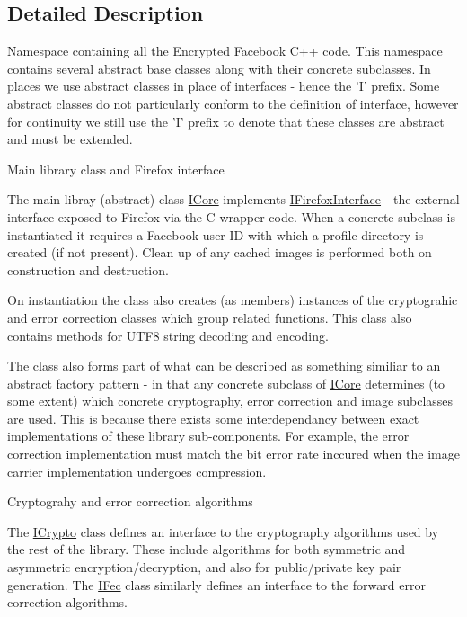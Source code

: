 \subsection{Detailed Description}
Namespace containing all the Encrypted Facebook C++ code. This namespace contains several abstract base classes along with their concrete subclasses. In places we use abstract classes in place of interfaces -\/ hence the 'I' prefix. Some abstract classes do not particularly conform to the definition of interface, however for continuity we still use the 'I' prefix to denote that these classes are abstract and must be extended.

\begin{DoxyParagraph}{Main library class and Firefox interface}

\end{DoxyParagraph}
The main libray (abstract) class \hyperlink{classefb_1_1ICore}{ICore} implements \hyperlink{classefb_1_1IFirefoxInterface}{IFirefoxInterface} -\/ the external interface exposed to Firefox via the C wrapper code. When a concrete subclass is instantiated it requires a Facebook user ID with which a profile directory is created (if not present). Clean up of any cached images is performed both on construction and destruction.

On instantiation the class also creates (as members) instances of the cryptograhic and error correction classes which group related functions. This class also contains methods for UTF8 string decoding and encoding.

The class also forms part of what can be described as something similiar to an abstract factory pattern -\/ in that any concrete subclass of \hyperlink{classefb_1_1ICore}{ICore} determines (to some extent) which concrete cryptography, error correction and image subclasses are used. This is because there exists some interdependancy between exact implementations of these library sub-\/components. For example, the error correction implementation must match the bit error rate inccured when the image carrier implementation undergoes compression.

\begin{DoxyParagraph}{Cryptograhy and error correction algorithms}

\end{DoxyParagraph}
The \hyperlink{classefb_1_1ICrypto}{ICrypto} class defines an interface to the cryptography algorithms used by the rest of the library. These include algorithms for both symmetric and asymmetric encryption/decryption, and also for public/private key pair generation. The \hyperlink{classefb_1_1IFec}{IFec} class similarly defines an interface to the forward error correction algorithms.


